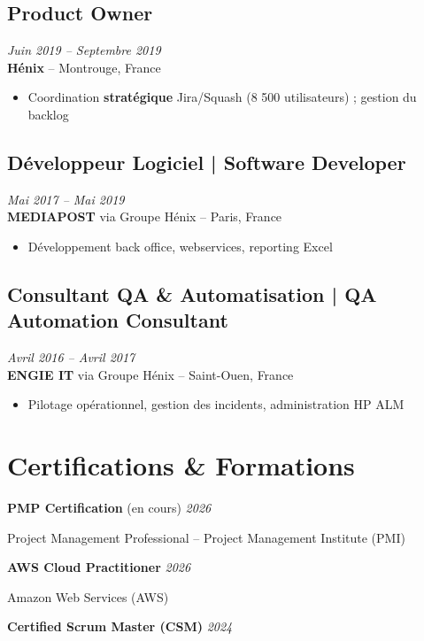 \documentclass[11pt,a4paper]{article}
\begin{document}
\subsection*{Product Owner} \hfill \textit{Juin 2019 -- Septembre 2019}\\
\textbf{Hénix} -- Montrouge, France\\
\begin{itemize}
    \item Coordination \textbf{stratégique} Jira/Squash (8 500 utilisateurs) ; gestion du backlog
\end{itemize}

\subsection*{Développeur Logiciel | Software Developer} \hfill \textit{Mai 2017 -- Mai 2019}\\
\textbf{MEDIAPOST} via Groupe Hénix -- Paris, France\\
\begin{itemize}
    \item Développement back office, webservices, reporting Excel
\end{itemize}

\subsection*{Consultant QA \& Automatisation | QA Automation Consultant} \hfill \textit{Avril 2016 -- Avril 2017}\\
\textbf{ENGIE IT} via Groupe Hénix -- Saint-Ouen, France\\
\begin{itemize}
    \item Pilotage opérationnel, gestion des incidents, administration HP ALM
\end{itemize}

\section*{Certifications \& Formations}

\textbf{PMP Certification} (en cours) \hfill \textit{2026}

Project Management Professional -- Project Management Institute (PMI)

\textbf{AWS Cloud Practitioner} \hfill \textit{2026}

Amazon Web Services (AWS)

\textbf{Certified Scrum Master (CSM)} \hfill \textit{2024}
\end{document}
